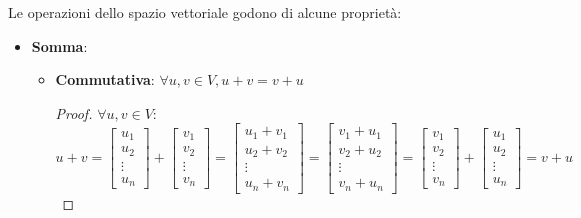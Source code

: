 Le operazioni dello spazio vettoriale godono di alcune proprietà:
\begin{itemize}
    \item \textbf{Somma}:
          \begin{itemize}
              \item \textbf{Commutativa}: $\forall u,v \in V, u+v = v+u$
                    \begin{proof}
                        $\forall u,v \in V:$
                        $$ u+v = \left[\begin{array}{c}
                                    u_1 \\u_2\\ \vdots \\u_n
                                \end{array}\right] + \left[\begin{array}{c}
                                    v_1 \\v_2\\\vdots\\v_n
                                \end{array}\right] = \left[\begin{array}{c}
                                    u_1 + v_1 \\u_2 + v_2\\\vdots\\u_n+v_n
                                \end{array}\right] = \left[\begin{array}{c}
                                    v_1 + u_1 \\v_2 + u_2\\\vdots\\v_n+u_n
                                \end{array}\right] = \left[\begin{array}{c}
                                    v_1 \\v_2\\\vdots\\v_n
                                \end{array}\right] + \left[\begin{array}{c}
                                    u_1 \\u_2 \\\vdots\\u_n
                                \end{array}\right] = v+ u$$
                    \end{proof}

\end{itemize}
\end{itemize}
